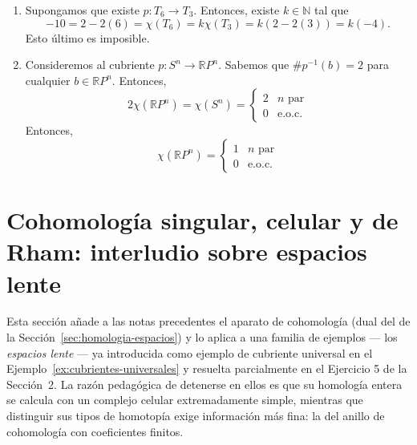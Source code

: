 \documentclass[11pt,a4paper]{article}
\theoremstyle{plain}
\theoremstyle{definition}
\theoremstyle{remark}
\newcommand{\RR}{\mathbb R}
\newcommand{\NN}{\mathbb N}
\begin{document}
\begin{enumerate}[label=\arabic*.,leftmargin=*]
\begin{enumerate}[label=\alph*)]
es compacto discreto. Es claro que $p(X^{(0)})\subset B^{(0)}$. Sea
$e_1\subset B^{(1)}$ una $1$-célula de $B$. Tal célula se obtiene
recolectando la frontera de $D^1=[0,1]$ sobre $B^{(0)}$. Sea
$q_1:D^1\to B$ la aplicación así obtenida. Como $D^1$ es simplemente
conexo, para toda elección de $x_0\in p^{-1}(q_1(0))$, esta aplicación se
levanta a una única aplicación $p_1:[0,1]\to X$ con $p(0)=x_0$ y
$p\circ p_1=q_1$. Se sigue de aquí que $p^{-1}(1)\in X^{(0)}$. Obtenemos de
esta manera que $X^{(1)}=p^{-1}(B^{(1)})$ es un complejo CW de dimensión
$1$ en donde las $1$-células están dadas por medio de las aplicaciones
$p_1$. Iterando la construcción precedente obtenemos que existen $k$
células de dimensión $q$ en $X$ por encima de una sola célula de dimensión
$q$ de $B$; en efecto, tal única célula está únicamente determinada por la
elección del levantamiento de un punto base de la célula de $B$. Por
consiguiente, $\alpha_n(X)=k\alpha_n(B)$ para cada $n\ge0$ y entonces
\[
\chi(X)=k\chi(B).
\]
\item Supongamos que existe $p:T_6\to T_3$. Entonces, existe $k\in\NN$ tal
que
\[
-10=2-2(6)=\chi(T_6)=k\chi(T_3)=k(2-2(3))=k(-4).
\]
Esto último es imposible.
\item Consideremos al cubriente $p:S^n\to\RR P^n$. Sabemos que
$\#p^{-1}(b)=2$ para cualquier $b\in\RR P^n$. Entonces,
\[
2\chi(\RR P^n)=\chi(S^n)=\begin{cases}2 & n\text{ par}\\0 & \text{e.o.c.}\end{cases}
\]
Entonces,
\[
\chi(\RR P^n)=\begin{cases}1 & n\text{ par}\\0 & \text{e.o.c.}\end{cases}
\]
\end{enumerate}

\end{enumerate}

\appendix

\section{Cohomología singular, celular y de Rham: interludio sobre espacios lente}

Esta sección añade a las notas precedentes el aparato de cohomología (dual
del de la Sección~\ref{sec:homologia-espacios}) y lo aplica a una familia
de ejemplos --- los \emph{espacios lente} --- ya introducida como ejemplo
de cubriente universal en el Ejemplo~\ref{ex:cubrientes-universales} y
resuelta parcialmente en el Ejercicio 5 de la Sección~2. La razón
pedagógica de detenerse en ellos es que su homología entera se calcula con
un complejo celular extremadamente simple, mientras que distinguir sus
tipos de homotopía exige información más fina: la del anillo de
cohomología con coeficientes finitos.
\label{sec:apendice-cohomologia}
\end{document}
